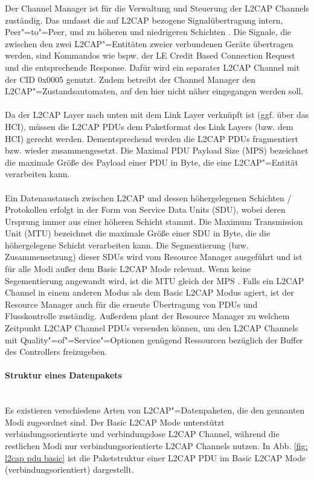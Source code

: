 Der Channel Manager ist für die Verwaltung und Steuerung der L2CAP Channels zuständig. Das umfasst die auf L2CAP bezogene Signalübertragung intern, Peer"=to"=Peer, und zu höheren und niedrigeren Schichten \cite{BtSpec4.0_1390}. 
Die Signale, die zwischen den zwei L2CAP"=Entitäten zweier verbundenen Geräte übertragen werden, sind Kommandos wie bspw. der LE Credit Based Connection Request und die entsprechende Response. Dafür wird ein separater L2CAP Channel mit der CID 0x0005 genutzt. Zudem betreibt der Channel Manager den L2CAP"=Zustandsautomaten, auf den hier nicht näher eingegangen werden soll.
\\\\
Da der L2CAP Layer nach unten mit dem Link Layer verknüpft ist (ggf. über das HCI), müssen die L2CAP PDUs dem Paketformat des Link Layers (bzw. dem HCI) gerecht werden. Dementsprechend werden die L2CAP PDUs fragmentiert bzw. wieder zusammengesetzt. Die Maximal PDU Payload Size (MPS) bezeichnet die maximale Größe des Payload einer PDU in Byte, die eine L2CAP"=Entität verarbeiten kann.
\\\\
Ein Datenaustausch zwischen L2CAP und dessen höhergelegenen Schichten / Protokollen erfolgt in der Form von Service Data Units (SDU), wobei deren Ursprung immer aus einer höheren Schicht stammt. Die Maximum Transmission Unit (MTU) bezeichnet die maximale Größe einer SDU in Byte, die die höhergelegene Schicht verarbeiten kann. Die Segmentierung (bzw. Zusammensetzung) dieser SDUs wird vom Resource Manager ausgeführt und ist für alle Modi außer dem Basic L2CAP Mode relevant. Wenn keine Segementierung angewandt wird, ist die MTU gleich der MPS \cite{BtSpec4.2_1727}. Falls ein L2CAP Channel in einem anderen Modus als dem Basic L2CAP Modus agiert, ist der Resource Manager auch für die erneute Übertragung von PDUs und Flusskontrolle zuständig. Außerdem plant der Resource Manager zu welchem Zeitpunkt L2CAP Channel PDUs versenden können, um den L2CAP Channels mit Quality"=of"=Service"=Optionen genügend Ressourcen bezüglich der Buffer des Controllers freizugeben. \cite{BtSpec4.2_185} \cite{BtSpec4.2_1725-1726}

\paragraph{Struktur eines Datenpakets} \mbox{} \vspace{0.2cm} \\
Es existieren verschiedene Arten von L2CAP"=Datenpaketen, die den gennanten Modi zugeordnet sind. Der Basic L2CAP Mode unterstützt verbindungsorientierte und verbindungslose L2CAP Channel, während die restlichen Modi nur verbindungsorientierte L2CAP Channels nutzen.
In Abb. \ref{fig: l2cap pdu basic} ist die Paketstruktur einer L2CAP PDU im Basic L2CAP Mode (verbindungsorientiert) dargestellt.

